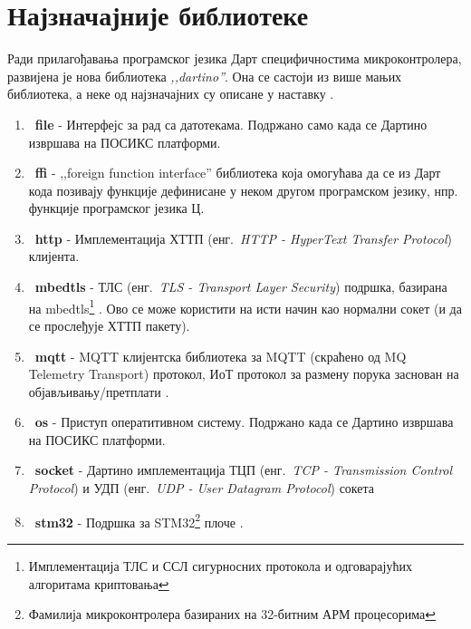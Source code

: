 \documentclass[12pt,oneside]{memoir}
\begin{document}
\section{Најзначајније библиотеке}
Ради прилагођавања програмског језика Дарт специфичностима микроконтролера, развијена је нова библиотека \textit{,,dartino''}. Она се састоји из више мањих библиотека, а неке од најзначајних су описане у наставку  \cite{biblioteke}.

\begin{enumerate}

\item ~\textbf{file} - Интерфејс за рад са датотекама. Подржано само када се Дартино извршава на ПОСИКС платформи.

\item ~\textbf{ffi} - ,,foreign function interface'' библиотека која омогућава да се из Дарт кода позивају функције дефинисане у неком другом програмском језику, нпр. функције програмског језика Ц.

\item ~\textbf{http} - Имплементација ХТТП (енг.~\textit{HTTP - HyperText Transfer Protocol}) клијента.

\item ~\textbf{mbedtls} - ТЛС (енг.~\textit{TLS - Transport Layer Security}) подршка, базирана на mbedtls\footnote{ Имплементација ТЛС и ССЛ сигурносних протокола и одговарајућих алгоритама криптовања} \cite{mbed}.
Ово се може користити на исти начин као нормални сокет (и да се прослеђује ХТТП пакету).

\item ~\textbf{mqtt} - MQTT клијентска библиотека за MQTT (скраћено од MQ Telemetry Transport) протокол, ИоТ протокол за размену порука заснован на објављивању/претплати \cite{mqtt}.

\item ~\textbf{os} - Приступ оператитивном систему. Подржано када се Дартино извршава на ПОСИКС платформи.

\item ~\textbf{socket} - Дартино имплементација ТЦП (енг.~\textit{TCP - Transmission Control Protocol}) и УДП (енг.~\textit{UDP - User Datagram Protocol}) сокета

\item ~\textbf{stm32} - Подршка за STM32\footnote{Фамилија микроконтролера базираних на 32-битним АРМ процесорима} плоче \cite{smt32}.

\end{enumerate}
\end{document}
